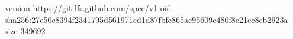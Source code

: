 version https://git-lfs.github.com/spec/v1
oid sha256:27c50c8394f2341795d561971cd1d87fbfe865ac95609c480f8e21cc8cb2923a
size 349692
